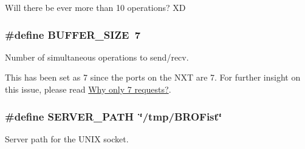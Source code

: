 Will there be ever more than 10 operations? XD \hypertarget{group___bro_fist_ga6b20d41d6252e9871430c242cb1a56e7}{
\subsubsection[{BUFFER\_\-SIZE}]{\setlength{\rightskip}{0pt plus 5cm}\#define BUFFER\_\-SIZE~7}}
\label{group___bro_fist_ga6b20d41d6252e9871430c242cb1a56e7}


Number of simultaneous operations to send/recv. 

This has been set as 7 since the ports on the NXT are 7. For further insight on this issue, please read \hyperlink{group___b_r_o_cos_comm_Why7}{Why only 7 requests?}. \hypertarget{group___bro_fist_ga6312573a3fccab201c412ad9ba7bafe6}{
\subsubsection[{SERVER\_\-PATH}]{\setlength{\rightskip}{0pt plus 5cm}\#define SERVER\_\-PATH~\char`\"{}/tmp/BROFist\char`\"{}}}
\label{group___bro_fist_ga6312573a3fccab201c412ad9ba7bafe6}


Server path for the UNIX socket. 

